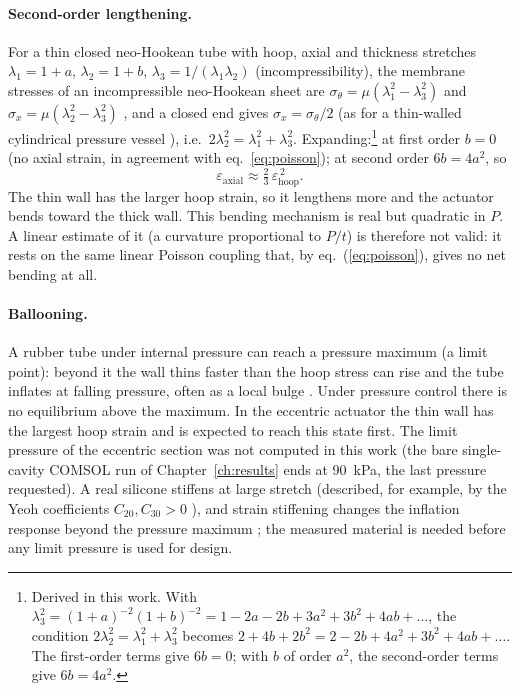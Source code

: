 \documentclass[12pt,a4paper,oneside]{report}
\numberwithin{equation}{chapter}
\numberwithin{figure}{chapter}
\numberwithin{table}{chapter}
\begin{document}
\paragraph{Second-order lengthening.} For a thin closed neo-Hookean tube with hoop, axial and thickness
stretches $\lambda_1=1+a$, $\lambda_2=1+b$, $\lambda_3=1/(\lambda_1\lambda_2)$ (incompressibility), the membrane
stresses of an incompressible neo-Hookean sheet are $\sigma_\theta=\mu(\lambda_1^2-\lambda_3^2)$ and
$\sigma_x=\mu(\lambda_2^2-\lambda_3^2)$ \cite{treloar1975,holzapfel2000}, and a closed end gives
$\sigma_x=\sigma_\theta/2$ (as for a thin-walled cylindrical pressure vessel \cite{gere2013}), i.e.\
$2\lambda_2^2=\lambda_1^2+\lambda_3^2$. Expanding:\footnote{Derived in this work. With
$\lambda_3^2=(1+a)^{-2}(1+b)^{-2}=1-2a-2b+3a^2+3b^2+4ab+\dots$, the condition
$2\lambda_2^2=\lambda_1^2+\lambda_3^2$ becomes $2+4b+2b^2=2-2b+4a^2+3b^2+4ab+\dots$. The first-order terms give
$6b=0$; with $b$ of order $a^2$, the second-order terms give $6b=4a^2$.} at first order $b=0$
(no axial strain, in agreement with eq.~\ref{eq:poisson}); at second order $6b=4a^2$, so
\begin{equation}
\varepsilon_{\text{axial}} \approx \tfrac{2}{3}\,\varepsilon_{\text{hoop}}^{\,2}. \label{eq:twothirds}
\end{equation}
The thin wall has the larger hoop strain, so it lengthens more and the actuator bends toward the thick wall.
This bending mechanism is real but quadratic in $P$. A linear estimate of it (a curvature proportional to
$P/t$) is therefore not valid: it rests on the same linear Poisson coupling that, by eq.~(\ref{eq:poisson}),
gives no net bending at all.

\paragraph{Ballooning.} A rubber tube under internal pressure can reach a pressure maximum (a limit point):
beyond it the wall thins faster than the hoop stress can rise and the tube inflates at falling pressure,
often as a local bulge \cite{gent2005}. Under pressure control there is no equilibrium above the maximum. In
the eccentric actuator the thin wall has the largest hoop strain and is expected to reach this state first.
The limit pressure of the eccentric section was not computed in this work (the bare single-cavity COMSOL run
of Chapter~\ref{ch:results} ends at \SI{90}{kPa}, the last pressure requested). A real silicone stiffens at
large stretch (described, for example, by the Yeoh coefficients $C_{20},C_{30}>0$ \cite{yeoh1993}), and
strain stiffening changes the inflation response beyond the pressure maximum \cite{gent2005}; the measured
material is needed before any limit pressure is used for design.
\end{document}
